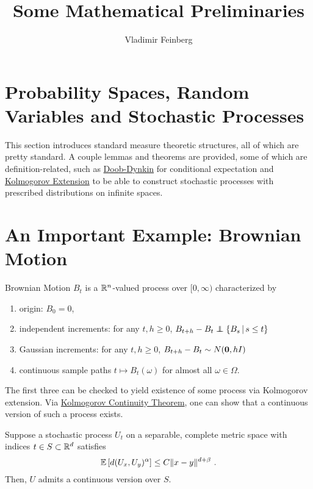 \documentclass{article}
\title{Some Mathematical Preliminaries}
\author{Vladimir Feinberg}
\begin{document}
\maketitle

\section{Probability Spaces, Random Variables and Stochastic Processes}

This section introduces standard measure theoretic structures, all of which are pretty standard. A couple lemmas and theorems are provided, some of which are definition-related, such as
\href{https://en.wikipedia.org/wiki/Doob%E2%80%93Dynkin_lemma}{Doob-Dynkin}
for conditional expectation and \href{https://en.wikipedia.org/wiki/Kolmogorov_extension_theorem}{Kolmogorov Extension} to be able to construct stochastic processes with prescribed distributions on infinite spaces.

\section{An Important Example: Brownian Motion}

\begin{definition}
  Brownian Motion \(B_t\) is a \(\mathbb{R}^n\)-valued process over \([0,\infty)\) characterized by
  \begin{enumerate}
    \item origin: \(B_0=0\),
    \item independent increments: for any \(t,h\ge 0\), \(B_{t+h}-B_{t}\independent \set{B_s}{s\le t}\)
    \item Gaussian increments: for any \(t,h\ge 0\), \(B_{t+h}-B_{t}\sim N(\mathbf{0}, h I)\)
    \item continuous sample paths \(t\mapsto B_t(\omega)\) for almost all \(\omega\in \Omega\).
    \end{enumerate}
  \end{definition}

  The first three can be checked to yield existence of some process via Kolmogorov extension. Via \href{https://en.wikipedia.org/wiki/Kolmogorov_continuity_theorem}{Kolmogorov Continuity Theorem}, one can show that a continuous version of such a process exists.

  \begin{theorem}
    Suppose a stochastic process \(U_t\) on a separable, complete metric space with indices \(t\in S\subset\mathbb{R}^d\) satisfies
    \[
      \operatorname{\mathbb{E}}\left[{d(U_x, U_y)^\alpha}\right]\le C\|x-y\|^{d+\beta}\,\,.
    \]
    Then, \(U\) admits a continuous version over \(S\).
    \end{theorem}
\end{document}
